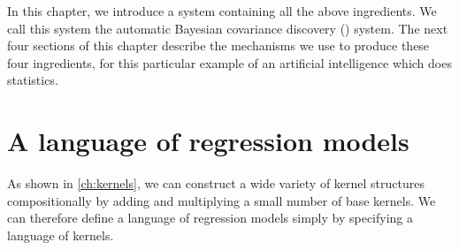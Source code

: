 In this chapter, we introduce a system containing all the above ingredients.
We call this system the automatic Bayesian covariance discovery (\procedurename{}) system.
The next four sections of this chapter describe the mechanisms we use to produce these four ingredients, for this particular example of an artificial intelligence which does statistics.



\section{A language of regression models}
\label{sec:improvements}

As shown in \cref{ch:kernels}, we can construct a wide variety of kernel structures compositionally by adding and multiplying a small number of base kernels.
We can therefore define a language of \gp{} regression models simply by specifying a language of kernels.

